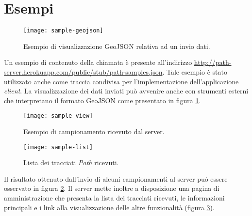 \section{Esempi}
\begin{figure}[ht]
  \centering
  \texttt{[image: sample-geojson]}
  \caption{\footnotesize{Esempio di visualizzazione GeoJSON relativa ad un invio dati.}}
  \label{fig:sample-geojson}
\end{figure}
Un esempio di contenuto della chiamata è presente all'indirizzo \url{http://path-server.herokuapp.com/public/stub/path-samples.json}. Tale esempio è stato utilizzato anche come traccia condivisa per l'implementazione dell'applicazione \emph{client}. La visualizzazione dei dati inviati può avvenire anche con strumenti esterni che interpretano il formato GeoJSON come presentato in figura \ref{fig:sample-geojson}.

\begin{figure}[ht]
  \centering
  \texttt{[image: sample-view]}
  \caption{\footnotesize{Esempio di campionamento ricevuto dal server.}}
  \label{fig:sample-view}
\end{figure}

\begin{figure}[ht]
  \centering
  \texttt{[image: sample-list]}
  \caption{\footnotesize{Lista dei tracciati \emph{Path} ricevuti.}}
  \label{fig:sample-list}
\end{figure}
Il risultato ottenuto dall'invio di alcuni campionamenti al server può essere osservato in figura \ref{fig:sample-view}. Il server mette inoltre a disposizione una pagina di amministrazione che presenta la lista dei tracciati ricevuti, le informazioni principali e i link alla visualizzazione delle altre funzionalità (figura \ref{fig:sample-list}).

